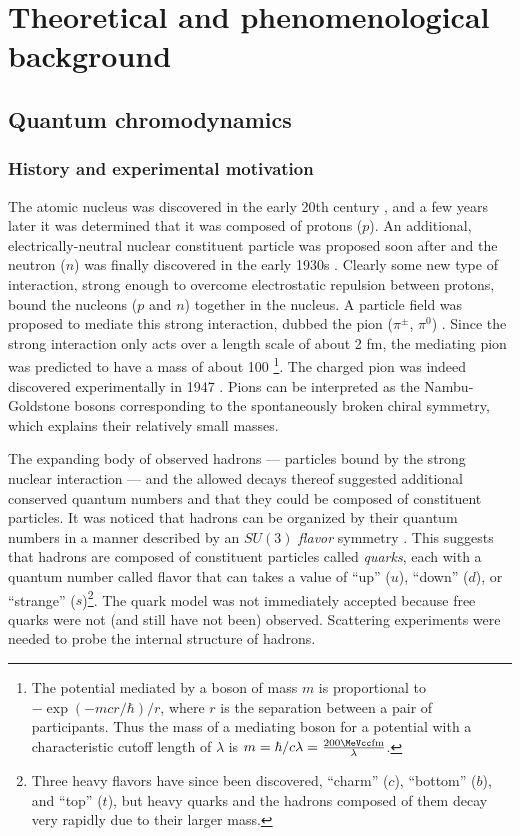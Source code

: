 \chapter{Theoretical and phenomenological background}
\label{ch:background}
\graphicspath{{Chapter-Background/figures/}}

\section{Quantum chromodynamics}
\subsection{History and experimental motivation}

The atomic nucleus was discovered in the early 20th century \cite{Rutherford:1911zz}, and a few years later it was determined that it was composed of protons ($p$).
An additional, electrically-neutral nuclear constituent particle was proposed soon after and the neutron ($n$) was finally discovered in the early 1930s \cite{Chadwick:1932ma}.
Clearly some new type of interaction, strong enough to overcome electrostatic repulsion between protons, bound the nucleons ($p$ and $n$) together in the nucleus.
A particle field was proposed to mediate this strong interaction, dubbed the pion ($\pi^\pm$, $\pi^0$) \cite{Yukawa:1935xg}.
Since the strong interaction only acts over a length scale of about 2 fm, the mediating pion was predicted to have a mass of about 100 \MeV\footnote{The potential mediated by a boson of mass $m$ is proportional to \( - \exp(-mcr/\hbar)/r\), where $r$ is the separation between a pair of participants. Thus the mass of a mediating boson for a potential with a characteristic cutoff length of $\lambda$ is $m = \hbar/c\lambda = \frac{200 \MeVcc \textrm{fm}}{\lambda}$.}.
The charged pion was indeed discovered experimentally in 1947 \cite{Lattes:1947mw}.
Pions can be interpreted as the Nambu-Goldstone bosons corresponding to the spontaneously broken chiral symmetry, which explains their relatively small masses.

The expanding body of observed hadrons --- particles bound by the strong nuclear interaction --- and the allowed decays thereof suggested additional conserved quantum numbers and that they could be composed of constituent particles.
It was noticed that hadrons can be organized by their quantum numbers in a manner described by an $SU(3)$ \emph{flavor} symmetry \cite{GellMann:1962xb}.
This suggests that hadrons are composed of constituent particles called \emph{quarks}, each with a quantum number called flavor that can takes a value of ``up'' ($u$), ``down'' ($d$), or ``strange'' ($s$)\footnote{Three heavy flavors have since been discovered, ``charm'' ($c$), ``bottom'' ($b$), and ``top'' ($t$), but heavy quarks and the hadrons composed of them decay very rapidly due to their larger mass.}.
The quark model was not immediately accepted because free quarks were not (and still have not been) observed.
Scattering experiments were needed to probe the internal structure of hadrons.

